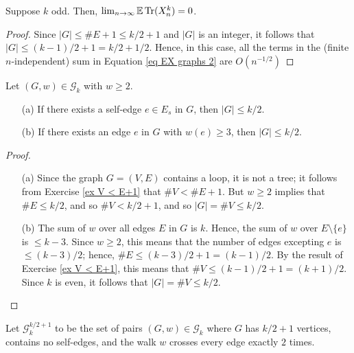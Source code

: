 \begin{proposition}
  \label{prop:odd_case}
  \notready
  Suppose $k$ odd. Then, $\lim_{n\to\infty} {\mathbb{E}}\operatorname{Tr}(X_n^k) = 0$.
\end{proposition}

\begin{proof}
  \notready
  Since $|G|\le \#E+1 \le k/2+1$ and $|G|$ is an integer, it follows that $|G|\le (k-1)/2+1 = k/2 + 1/2$.  Hence, in this case, all the terms in the (finite $n$-independent) sum in Equation \ref{eq EX graphs 2} are $O(n^{-1/2})$
\end{proof}



\begin{proposition}%
  \label{prop:4_4}
  \notready
  Let $(G,w)\in\mathcal{G}_k$ with $w\ge 2$.
  \begin{itemize}
  \item[(a)] If there exists a self-edge $e\in E_s$ in $G$, then $|G|\le k/2$.
  \item[(b)] If there exists an edge $e$ in $G$ with $w(e)\ge 3$, then $|G|\le k/2$.
  \end{itemize}
\end{proposition}

\begin{proof}
  \notready
  \begin{itemize}
    \item[(a)] Since the graph $G = (V,E)$ contains a loop, it is not a tree; it follows from Exercise \ref{ex V < E+1} that $\#V < \#E+1$.  But $w\ge 2$ implies that $\#E\le k/2$, and so $\#V < k/2+1$, and so $|G| = \#V \le k/2$.

    \item[(b)] The sum of $w$ over all edges $E$ in $G$ is $k$.  Hence, the sum of $w$ over $E\setminus\{e\}$ is $\le k-3$.  Since $w\ge 2$, this means that the number of edges excepting $e$ is $\le (k-3)/2$; hence, $\#E \le (k-3)/2+1 = (k-1)/2$.  By the result of Exercise \ref{ex V < E+1}, this means that $\#V \le (k-1)/2+1 = (k+1)/2$.  Since $k$ is even, it follows that $|G|=\#V \le k/2$.
  \end{itemize}
\end{proof}




\begin{definition}
  \label{def:special_set_g}
  \notready
  Let $\mathcal{G}^{k/2+1}_k$ to be the set of pairs $(G,w)\in\mathcal{G}_k$ where $G$ has $k/2+1$ vertices, contains no self-edges, and the walk $w$ crosses every edge exactly $2$ times.
\end{definition}


